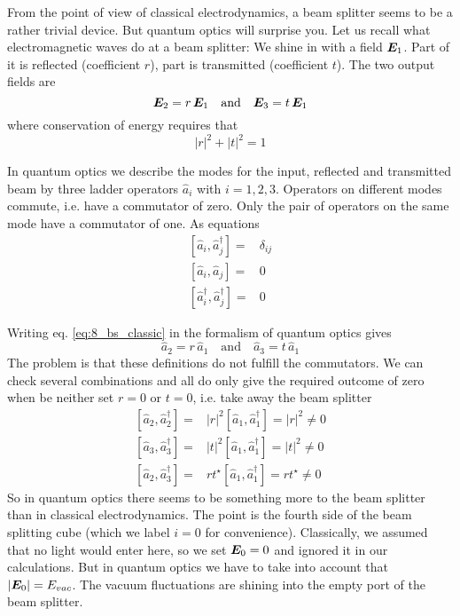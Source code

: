 From the point of view of classical electrodynamics, a beam splitter seems to be a rather trivial device. But quantum optics will surprise you. Let us recall what electromagnetic waves do at a beam splitter: We shine in with a field $\boldsymbol{E}_1$. Part of it is reflected (coefficient $r$), part is transmitted (coefficient $t$). The two output fields are
\begin{equation}
    \boldsymbol{E}_2 = r \, \boldsymbol{E}_1 \quad \text{and} \quad  \boldsymbol{E}_3 = t \, \boldsymbol{E}_1 \label{eq:8_bs_classic}
\end{equation}
where conservation of energy requires that 
\begin{equation}
    |r|^2 + |t|^2 = 1
\end{equation}


In quantum optics we describe the modes for the input, reflected and transmitted beam by three ladder operators $\hat{a}_i$ with $i = 1,2,3$. Operators on different modes commute, i.e. have a commutator of zero. Only the pair of operators on the same mode have a commutator of one. As equations
\begin{align}
    \left[ \hat{a}_i, \hat{a}_j^\dagger  \right] = &  \delta_{ij} \\
    \left[ \hat{a}_i, \hat{a}_j  \right] = &  0 \\
    \left[ \hat{a}^\dagger_i, \hat{a}^\dagger_j  \right] = &  0 
\end{align}

Writing eq. \ref{eq:8_bs_classic} in the formalism of quantum optics gives
\begin{equation}
    \hat{a}_2 = r \, \hat{a}_1 \quad \text{and} \quad  \hat{a}_3 = t \, \hat{a}_1  \label{eq:8_bs_QO1}
\end{equation}
The problem is that these definitions do not fulfill the commutators. We can check several combinations and all do only give the required outcome of zero when be neither set $r=0$ or $t=0$, i.e. take away the beam splitter
\begin{align}
    \left[ \hat{a}_2, \hat{a}_2^\dagger  \right] = &  |r|^2 \left[ \hat{a}_1, \hat{a}_1^\dagger  \right] =  |r|^2  \neq 0 \\
    \left[ \hat{a}_3, \hat{a}_3^\dagger  \right] = &  |t|^2 \left[ \hat{a}_1, \hat{a}_1^\dagger  \right] =  |t|^2  \neq 0 \\
    \left[ \hat{a}_2, \hat{a}_3^\dagger  \right] = &  rt^\star \left[ \hat{a}_1, \hat{a}_1^\dagger  \right] =   rt^\star  \neq 0 
\end{align}
So in quantum optics there seems to be something more to the beam splitter than in classical electrodynamics. The point is the fourth side of the beam splitting cube (which we label $i=0$ for convenience). Classically, we assumed that no light would enter here, so we set $\boldsymbol{E}_0 = 0$ and ignored it in our calculations. But in quantum optics we have to take into account that $|\boldsymbol{E}_0| = E_{vac}$. The vacuum fluctuations are shining into the empty port of the beam splitter.

